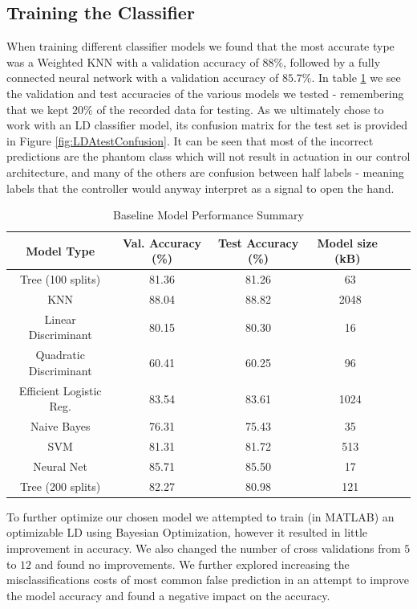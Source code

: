 \documentclass[10pt]{article}
\begin{document}
\subsection{Training the Classifier}
When training different classifier models we found that the most accurate type was a Weighted KNN with a validation accuracy of $88\%$, followed by a fully connected neural network with a validation accuracy of $85.7\%$. In table \ref{tab:basel_model_perf} we see the validation and test accuracies of the various models we tested - remembering that we kept $20\%$ of the recorded data for testing. As we ultimately chose to work with an LD classifier model, its confusion matrix for the test set is provided in Figure \ref{fig:LDAtestConfusion}. It can be seen that most of the incorrect predictions are the phantom class which will not result in actuation in our control architecture, and many of the others are confusion between half labels - meaning labels that the controller would anyway interpret as a signal to open the hand.

\begin{table}[H]
\centering
\caption{Baseline Model Performance Summary}
\label{tab:basel_model_perf}
\begin{tabular}{cccccc}
\toprule
Model Type & Val. Accuracy (\%) & Test Accuracy (\%) & Model size (kB) \\
\midrule
Tree (100 splits)       & 81.36 & 81.26 & ~63 \\
KNN                     & 88.04 & 88.82 & ~2048 \\
Linear Discriminant     & 80.15 & 80.30 & ~16 \\
Quadratic Discriminant  & 60.41 & 60.25 & ~96 \\
Efficient Logistic Reg. & 83.54 & 83.61 & ~1024 \\
Naive Bayes             & 76.31 & 75.43 & ~35 \\
SVM                     & 81.31 & 81.72 & ~513 \\
Neural Net              & 85.71 & 85.50 & ~17 \\
Tree (200 splits)       & 82.27 & 80.98 & ~121 \\
\bottomrule
\end{tabular}
\end{table}

To further optimize our chosen model we attempted to train (in MATLAB) an optimizable LD using Bayesian Optimization, however it resulted in little improvement in accuracy. We also changed the number of cross validations from $5$ to $12$ and found no improvements. We further explored increasing the misclassifications costs of most common false prediction in an attempt to improve the model accuracy and found a negative impact on the accuracy.
\end{document}
